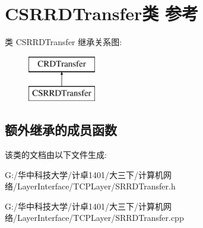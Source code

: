 \hypertarget{class_c_s_r_r_d_transfer}{}\section{C\+S\+R\+R\+D\+Transfer类 参考}
\label{class_c_s_r_r_d_transfer}
类 C\+S\+R\+R\+D\+Transfer 继承关系图\+:\begin{figure}[H]
\begin{center}
\leavevmode
\includegraphics[height=2.000000cm]{class_c_s_r_r_d_transfer}
\end{center}
\end{figure}
\subsection*{额外继承的成员函数}


该类的文档由以下文件生成\+:\begin{DoxyCompactItemize}
\item 
G\+:/华中科技大学/计卓1401/大三下/计算机网络/\+Layer\+Interface/\+T\+C\+P\+Layer/S\+R\+R\+D\+Transfer.\+h\item 
G\+:/华中科技大学/计卓1401/大三下/计算机网络/\+Layer\+Interface/\+T\+C\+P\+Layer/S\+R\+R\+D\+Transfer.\+cpp\end{DoxyCompactItemize}
